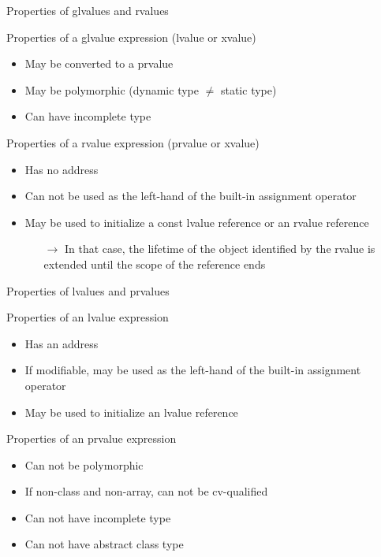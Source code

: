\begin{frame}{Properties of glvalues and rvalues}{}
  \begin{block}{Properties of a glvalue expression (lvalue or xvalue)}
    \begin{itemize}
    \item
      May be converted to a prvalue
    \item
      May be polymorphic (dynamic type $\neq$ static type)
    \item
      Can have incomplete type
    \end{itemize}
  \end{block}

  \begin{block}{Properties of a rvalue expression (prvalue or xvalue)}
    \begin{itemize}
    \item
      Has no address
    \item
      Can not be used as the left-hand of the built-in assignment operator
    \item
      May be used to initialize a const lvalue reference or an rvalue reference
      \begin{itemize}
      \item[$\to$]
        In that case, the lifetime of the object identified by the rvalue is extended until the scope of the reference ends
      \end{itemize}
    \end{itemize}
  \end{block}
\end{frame}

\begin{frame}{Properties of lvalues and prvalues}{}
  \begin{block}{Properties of an lvalue expression}
    \begin{itemize}
    \item
      Has an address
    \item
      If modifiable, may be used as the left-hand of the built-in assignment operator
    \item
      May be used to initialize an lvalue reference
    \end{itemize}
  \end{block}

  \begin{block}{Properties of an prvalue expression}
    \begin{itemize}
    \item
      Can not be polymorphic
    \item
      If non-class and non-array, can not be cv-qualified
    \item
      Can not have incomplete type
    \item
      Can not have abstract class type
    \end{itemize}
  \end{block}
\end{frame}

